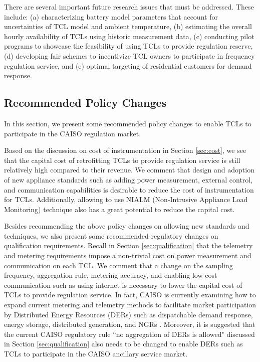 \documentclass[onecolumn,journal]{IEEEtran}
\begin{document}
\begin{table}[tb]
There are several important future research issues that must be addressed. These include: (a) characterizing battery model parameters that account for uncertainties of TCL model and ambient temperature, (b) estimating the overall hourly availability of TCLs using historic measurement data, (c) conducting pilot programs to showcase the feasibility of using TCLs to provide regulation reserve, (d) developing fair schemes to incentivize \ac{TCL} owners to participate in frequency regulation service, and (e) optimal targeting of residential customers for 
demand response. 

\subsection{Recommended Policy Changes}
In this section, we present some recommended policy changes to enable \acp{TCL} to participate in the \ac{CAISO} regulation market. 

Based on the discussion on cost of instrumentation in Section \ref{sec:cost}, we see that the capital cost of retrofitting TCLs to provide regulation service is still relatively high compared to their revenue. We comment that design and adoption of new appliance standards such as adding power measurement, external control, and communication capabilities is desirable to reduce the cost of instrumentation for TCLs. Additionally, allowing to use NIALM (Non-Intrusive Appliance Load Monitoring) technique also has a great potential to reduce the capital cost.  

Besides recommending the above policy changes on allowing new standards and techniques, we also present some recommended regulatory changes on qualification requirements. Recall in Section \ref{sec:qualification} that the telemetry and metering requirements impose a non-trivial cost on power measurement and communication on each \ac{TCL}. We comment that a change on the sampling frequency, aggregation rule, metering accuracy, and enabling low cost communication such as using internet is necessary to lower the capital cost of \acp{TCL} to provide regulation service. In fact, CAISO is currently examining how to expand current metering and telemetry methods  to facilitate market participation by Distributed Energy Resources (DERs) such as dispatchable demand response, energy storage, distributed generation, and NGRs \cite{CAISO_telemetry_change}. Moreover, it is suggested that the current CAISO regulatory rule ``no aggregation of DERs is allowed" discussed in Section \ref{sec:qualification}  also needs to be changed to enable DERs such as TCLs to participate in the CAISO ancillary service market. 


\end{table}
\end{document}
